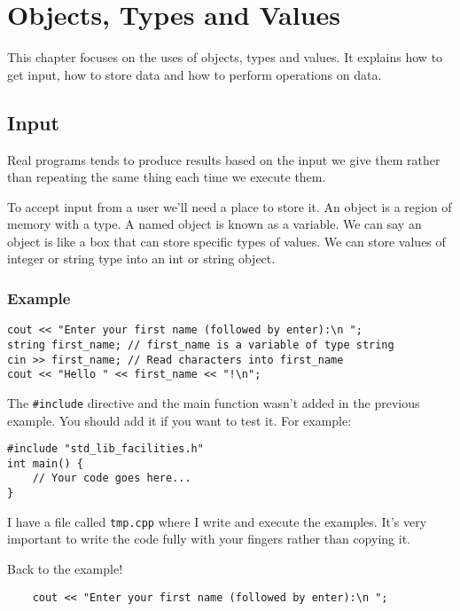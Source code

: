 \documentclass{book}
\begin{document}
\chapter{Objects, Types and Values}
This chapter focuses on the uses of objects, types and values. It explains how to get input, how to store data and how to perform operations on data.

\section{Input}
Real programs tends to produce results based on the input we give them rather than repeating the same thing each time we execute them.

To accept input from a user we'll need a place to store it. An object is a region of memory with a type. A named object is known as a variable. We can say an object is like a box that can store specific types of values. We can store values of integer or string type into an int or string object.

\subsection*{Example}

\begin{verbatim}
cout << "Enter your first name (followed by enter):\n ";
string first_name; // first_name is a variable of type string
cin >> first_name; // Read characters into first_name
cout << "Hello " << first_name << "!\n";
\end{verbatim}

The \verb|#include| directive and the main function wasn't added in the previous example. You should add it if you want to test it. For example:

\begin{verbatim}
#include "std_lib_facilities.h"
int main() {
	// Your code goes here...
}
\end{verbatim}

I have a file called \verb|tmp.cpp| where I write and execute the examples. It's very important to write the code fully with your fingers rather than copying it.

Back to the example!

\begin{verbatim}
	cout << "Enter your first name (followed by enter):\n ";
\end{verbatim}
\end{document}
